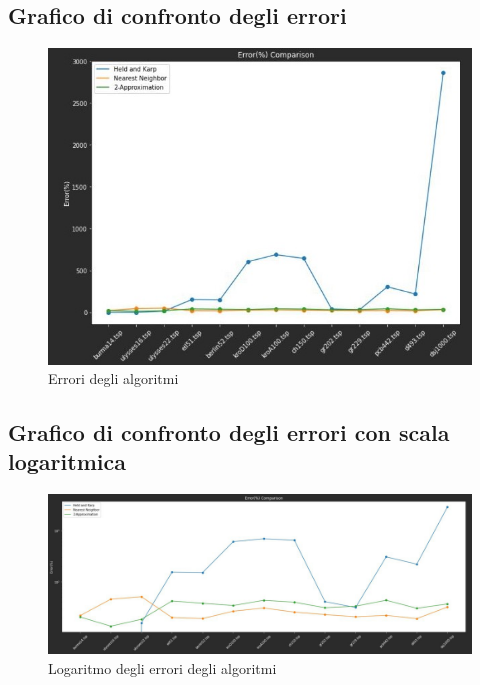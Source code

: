 \subsection{Grafico di confronto degli errori}
\begin{center}
	\begin{figure}[H]
		\centering
		\hspace{-1cm}\includegraphics[width=12cm]{Img/graph_error.jpg}
		\caption{Errori degli algoritmi}
	\end{figure}
\end{center}

\subsection{Grafico di confronto degli errori con scala logaritmica}
\begin{center}
	\begin{figure}[H]
		\centering
		\hspace{-1cm}\includegraphics[width=16cm]{Img/graph_logerror.jpg}
		\caption{Logaritmo degli errori degli algoritmi}
	\end{figure}
\end{center}

	

\pagebreak